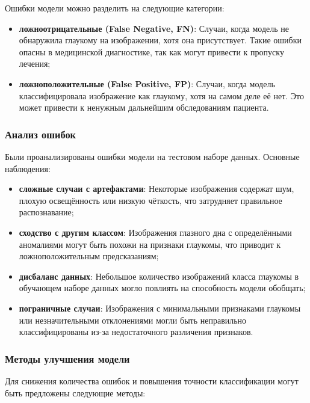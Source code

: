 {    Ошибки модели можно разделить на следующие категории:

    \begin{itemize}
        \item \textbf{ложноотрицательные (False Negative, FN)}: Случаи, когда модель не обнаружила глаукому на изображении, хотя она присутствует. Такие ошибки опасны в медицинской диагностике, так как могут привести к пропуску лечения;
        \item \textbf{ложноположительные (False Positive, FP)}: Случаи, когда модель классифицировала изображение как глаукому, хотя на самом деле её нет. Это может привести к ненужным дальнейшим обследованиям пациента.
    \end{itemize}

    \subsubsection*{Анализ ошибок}

    Были проанализированы ошибки модели на тестовом наборе данных. Основные наблюдения:

    \begin{itemize}
        \item \textbf{сложные случаи с артефактами}: Некоторые изображения содержат шум, плохую освещённость или низкую чёткость, что затрудняет правильное распознавание;
        \item \textbf{сходство с другим классом}: Изображения глазного дна с определёнными аномалиями могут быть похожи на признаки глаукомы, что приводит к ложноположительным предсказаниям;
        \item \textbf{дисбаланс данных}: Небольшое количество изображений класса глаукомы в обучающем наборе данных могло повлиять на способность модели обобщать;
        \item \textbf{пограничные случаи}: Изображения с минимальными признаками глаукомы или незначительными отклонениями могли быть неправильно классифицированы из-за недостаточного различения признаков.
    \end{itemize}

    \subsubsection*{Методы улучшения модели}

    Для снижения количества ошибок и повышения точности классификации могут быть предложены следующие методы:

}
